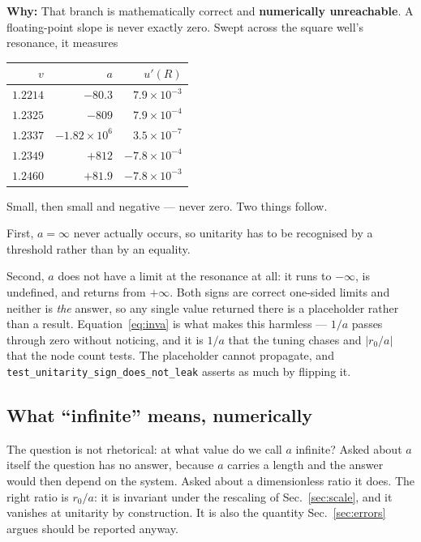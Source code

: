 \documentclass[11pt,a4paper]{article}
\newcommand{\why}[1]{\medskip\noindent\textbf{Why:} #1\medskip}
\begin{document}
\why{That branch is mathematically correct and \textbf{numerically
unreachable}. A floating-point slope is never exactly zero. Swept across the
square well's resonance, it measures

\begin{center}
\begin{tabular}{rrr}
\toprule
$v$ & $a$ & $u'(R)$ \\
\midrule
$1.2214$ & $-80.3$ & $7.9\times10^{-3}$ \\
$1.2325$ & $-809$ & $7.9\times10^{-4}$ \\
$1.2337$ & $-1.82\times10^{6}$ & $3.5\times10^{-7}$ \\
$1.2349$ & $+812$ & $-7.8\times10^{-4}$ \\
$1.2460$ & $+81.9$ & $-7.8\times10^{-3}$ \\
\bottomrule
\end{tabular}
\end{center}

\noindent
Small, then small and negative --- never zero. Two things follow.

First, $a = \infty$ never actually occurs, so unitarity has to be recognised by
a threshold rather than by an equality.

Second, $a$ does not have a limit at the resonance at all: it runs to
$-\infty$, is undefined, and returns from $+\infty$. Both signs are correct
one-sided limits and neither is \emph{the} answer, so any single value returned
there is a placeholder rather than a result. Equation~\eqref{eq:inva} is what
makes this harmless --- $1/a$ passes through zero without noticing, and it is
$1/a$ that the tuning chases and $|r_0/a|$ that the node count tests. The
placeholder cannot propagate, and
\texttt{test\_unitarity\_sign\_does\_not\_leak} asserts as much by flipping it.}

\subsection*{What ``infinite'' means, numerically}
\label{sec:unitaritythreshold}

The question is not rhetorical: at what value do we call $a$ infinite? Asked
about $a$ itself the question has no answer, because $a$ carries a length and
the answer would then depend on the system. Asked about a dimensionless ratio
it does. The right ratio is $r_0/a$: it is invariant under the rescaling of
Sec.~\ref{sec:scale}, and it vanishes at unitarity by construction. It is also
the quantity Sec.~\ref{sec:errors} argues should be reported anyway.
\end{document}
